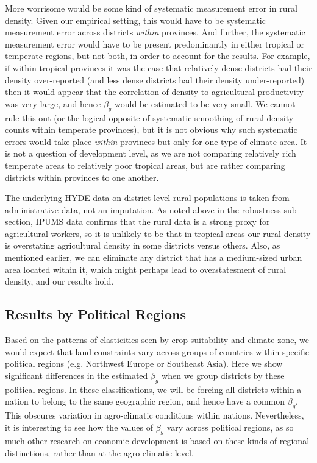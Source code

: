 More worrisome would be some kind of systematic measurement error in rural density. Given our empirical setting, this would have to be systematic measurement error across districts \textit{within} provinces. And further, the systematic measurement error would have to be present predominantly in either tropical or temperate regions, but not both, in order to account for the results. For example, if within tropical provinces it was the case that relatively dense districts had their density over-reported (and less dense districts had their density under-reported) then it would appear that the correlation of density to agricultural productivity was very large, and hence $\beta_g$ would be estimated to be very small. We cannot rule this out (or the logical opposite of systematic smoothing of rural density counts within temperate provinces), but it is not obvious why such systematic errors would take place \textit{within} provinces but only for one type of climate area. It is not a question of development level, as we are not comparing relatively rich temperate areas to relatively poor tropical areas, but are rather comparing districts within provinces to one another. 

The underlying HYDE data on district-level rural populations is taken from administrative data, not an imputation. As noted above in the robustness sub-section, IPUMS data confirms that the rural data is a strong proxy for agricultural workers, so it is unlikely to be that in tropical areas our rural density is overstating agricultural density in some districts versus others. Also, as mentioned earlier, we can eliminate any district that has a medium-sized urban area located within it, which might perhaps lead to overstatesment of rural density, and our results hold.

\subsection{Results by Political Regions}
Based on the patterns of elasticities seen by crop suitability and climate zone, we would expect that land constraints vary across groups of countries within specific political regions (e.g. Northwest Europe or Southeast Asia). Here we show significant differences in the estimated $\beta_g$ when we group districts by these political regions. In these classifications, we will be forcing all districts within a nation to belong to the same geographic region, and hence have a common $\beta_g$. This obscures variation in agro-climatic conditions within nations. Nevertheless, it is interesting to see how the values of $\beta_g$ vary across political regions, as so much other research on economic development is based on these kinds of regional distinctions, rather than at the agro-climatic level.

